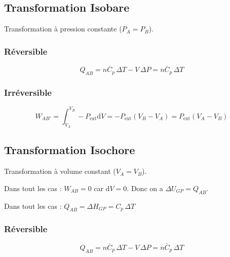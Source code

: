 \documentclass[a4paper,12pt]{article}
\newcommand{\diff}{\mathrm{d}} %
\newcommand{\Cp}{\overline{C}_p} %
\begin{document}
    \subsection{Transformation Isobare}
        
        Transformation à pression constante ($P_A=P_B$).

        \subsubsection{Réversible}
            $$ Q_{AB} = n \Cp \, \Delta T - V \, \Delta P = n \Cp \, \Delta T $$
        
        \subsubsection{Irréversible}
            $$ W_{AB'} = \int_{V_A}^{V_B} -P_{\text{ext}} \diff V = -P_{\text{ext}}(V_B-V_A) = P_{\text{ext}}(V_A-V_B) $$

    \subsection{Transformation Isochore}

        Transformation à volume constant ($V_A=V_B$).

        Dans tout les cas : $ W_{AB} = 0 $ car $ \diff V = 0 $. Donc on a $ \Delta U_{GP} = Q_{AB} $.
        
        Dans tout les cas : $Q_{AB} = \Delta H_{GP} = C_p \, \Delta T $
                
        \subsubsection{Réversible}

             $$ Q_{AB} = n \Cp \, \Delta T - V \, \Delta P = n \Cp \, \Delta T $$
\end{document}
